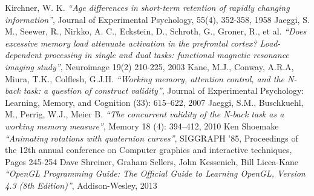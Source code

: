 \begin{thebibliography}{99}
  Kirchner, W. K.
  \emph{``Age differences in short-term retention of rapidly changing information''},
  Journal of Experimental Psychology, 55(4), 352-358,
  1958
  Jaeggi, S. M., Seewer, R., Nirkko, A. C., Eckstein, D., Schroth, G., Groner, R., et al.
  \emph{``Does excessive memory load attenuate activation in the prefrontal cortex? Load-dependent processing in single and dual tasks: functional magnetic resonance imaging study''},
  Neuroimage 19(2) 210-225,
  2003
  Kane, M.J., Conway, A.R.A, Miura, T.K., Colflesh, G.J.H.
  \emph{``Working memory, attention control, and the N-back task: a question of construct validity''},
  Journal of Experimental Psychology: Learning, Memory, and Cognition (33): 615–622,
  2007
  Jaeggi, S.M., Buschkuehl, M., Perrig, W.J., Meier B.
  \emph{``The concurrent validity of the N-back task as a working memory measure''},
  Memory 18 (4): 394–412,
  2010
  Ken Shoemake
  \emph{``Animating rotations with quaternion curves''},
  SIGGRAPH '85,
  Proceedings of the 12th annual conference on Computer graphics and interactive techniques,
  Pages 245-254
  Dave Shreiner, Graham Sellers, John Kessenich, Bill Licea-Kane
  \emph{``OpenGL Programming Guide: The Official Guide to Learning OpenGL, Version 4.3 (8th Edition)''},
  Addison-Wesley,
  2013
\end{thebibliography}
